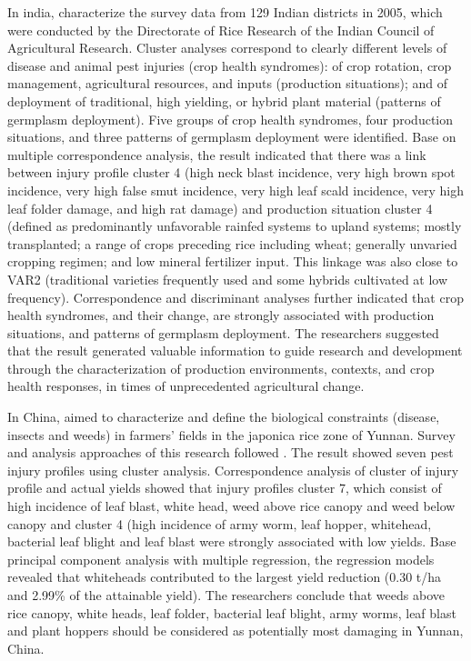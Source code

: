 In india, \cite{reddy2011characterizing} characterize the survey data from 129 Indian districts in 2005, which were conducted by the Directorate of Rice Research of the Indian Council of Agricultural Research. Cluster analyses correspond to clearly different levels of disease and animal pest injuries (crop health syndromes): of crop rotation, crop management, agricultural resources, and inputs (production situations); and of deployment of traditional, high yielding, or hybrid plant material (patterns of germplasm deployment). Five groups of crop health syndromes, four production situations, and three patterns of germplasm deployment were identified. Base on multiple correspondence analysis, the result indicated that there was a link between injury profile cluster 4 (high neck blast incidence, very high brown spot incidence, very high false smut incidence, very high leaf scald incidence, very high leaf folder damage, and high rat damage) and production situation cluster 4 (defined as predominantly unfavorable rainfed systems to upland systems; mostly transplanted; a range of crops preceding rice including wheat; generally unvaried cropping regimen; and low mineral fertilizer input. This linkage was also close to VAR2 (traditional varieties frequently used and some hybrids cultivated at low frequency). Correspondence and discriminant analyses further indicated that crop health syndromes, and their change, are strongly associated with production situations, and patterns of germplasm deployment. The researchers suggested that the result generated valuable information to guide research and development through the characterization of production environments, contexts, and crop health responses, in times of unprecedented agricultural change. 

In China, \cite{dong2010characterization} aimed to characterize and define the biological constraints (disease, insects and weeds) in farmers' fields in the japonica rice zone of Yunnan. Survey and analysis approaches of this research followed \cite{savary2000}. The result showed seven pest injury profiles using cluster analysis. Correspondence analysis of cluster of injury profile and actual yields showed that injury profiles cluster 7, which consist of high incidence of leaf blast, white head, weed above rice canopy and weed below canopy and cluster 4 (high incidence of army worm, leaf hopper, whitehead, bacterial leaf blight and leaf blast were strongly associated with low yields. Base principal component analysis with multiple regression, the regression models revealed that whiteheads contributed to the largest yield reduction (0.30 t/ha and 2.99\% of the attainable yield). The researchers conclude that weeds above rice canopy, white heads, leaf folder, bacterial leaf blight, army worms, leaf blast and plant hoppers should be considered as potentially most damaging in Yunnan, China.

